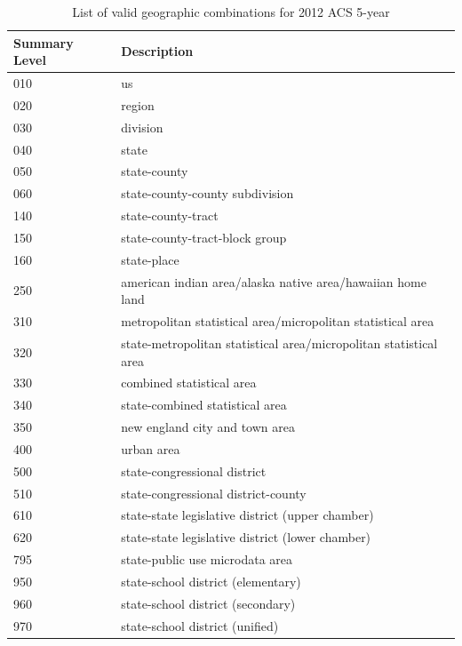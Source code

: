 \documentclass{article}\usepackage[]{graphicx}\usepackage[]{color}
\begin{document}
\begin{table}[ht]
\centering
\begin{tabular}{ll}
  \hline
Summary Level & Description \\ 
  \hline
  010 & us \\ 
  020 & region \\ 
  030 & division \\ 
  040 & state \\ 
  050 & state-county \\ 
  060 & state-county-county subdivision \\ 
  140 & state-county-tract \\ 
  150 & state-county-tract-block group \\ 
  160 & state-place \\ 
  250 & american indian area/alaska native area/hawaiian home land \\ 
  310 & metropolitan statistical area/micropolitan statistical area \\ 
  320 & state-metropolitan statistical area/micropolitan statistical area \\ 
  330 & combined statistical area \\ 
  340 & state-combined statistical area \\ 
  350 & new england city and town area \\ 
  400 & urban area \\ 
  500 & state-congressional district \\ 
  510 & state-congressional district-county \\ 
  610 & state-state legislative district (upper chamber) \\ 
  620 & state-state legislative district (lower chamber) \\ 
  795 & state-public use microdata area \\ 
  950 & state-school district (elementary) \\ 
  960 & state-school district (secondary) \\ 
  970 & state-school district (unified) \\ 
   \hline
\end{tabular}
\caption{List of valid geographic combinations for 2012 ACS 5-year}
\label{tab:geolist}
\end{table}
\end{document}
